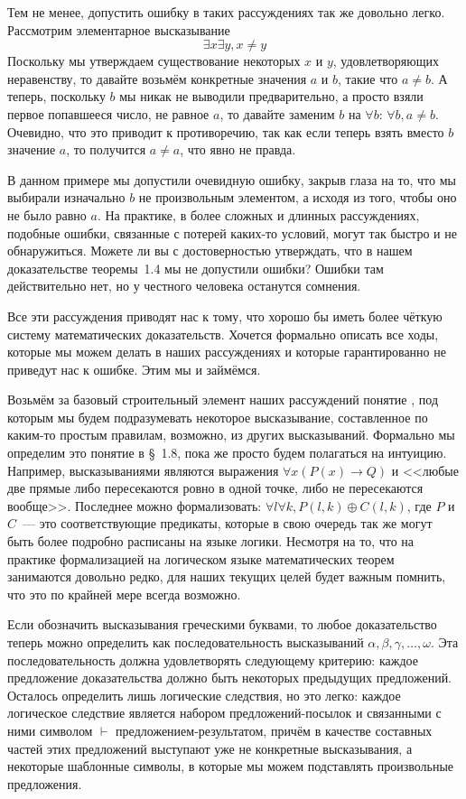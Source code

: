 Тем не менее, допустить ошибку в таких рассуждениях так же довольно легко. Рассмотрим элементарное высказывание $$\exists x \exists y, x\not= y$$
Поскольку мы утверждаем существование некоторых $x$ и $y$, удовлетворяющих неравенству, то давайте возьмём конкретные значения $a$ и $b$, такие что $a\not= b$. А теперь, поскольку $b$ мы никак не выводили предварительно, а просто взяли первое попавшееся число, не равное $a$, то давайте заменим $b$ на $\forall b$: $\forall b, a\not= b$. Очевидно, что это приводит к противоречию, так как если теперь взять вместо $b$ значение $a$, то получится $a\not= a$, что явно не правда.

В данном примере мы допустили очевидную ошибку, закрыв глаза на то, что мы выбирали изначально $b$ не произвольным элементом, а исходя из того, чтобы оно не было равно $a$. На практике, в более сложных и длинных рассуждениях, подобные ошибки, связанные с потерей каких-то условий, могут так быстро и не обнаружиться. Можете ли вы с достоверностью утверждать, что в нашем доказательстве теоремы~1.4 мы не допустили ошибки? Ошибки там действительно нет, но у честного человека останутся сомнения.

Все эти рассуждения приводят нас к тому, что хорошо бы иметь более чёткую систему математических доказательств. Хочется формально описать все ходы, которые мы можем делать в наших рассуждениях и которые гарантированно не приведут нас к ошибке. Этим мы и займёмся.

Возьмём за базовый строительный элемент наших рассуждений понятие , под которым мы будем подразумевать некоторое высказывание, составленное по каким-то простым правилам, возможно, из других высказываний. Формально мы определим это понятие в \S~1.8, пока же просто будем полагаться на интуицию. Например, высказываниями являются выражения $\forall x (P(x)\to Q)$ и <<любые две прямые либо пересекаются ровно в одной точке, либо не пересекаются вообще>>. Последнее можно формализовать: $\forall l \forall k, P(l, k) \oplus C(l, k)$, где $P$ и $C$~--- это соответствующие предикаты, которые в свою очередь так же могут быть более подробно расписаны на языке логики. Несмотря на то, что на практике формализацией на логическом языке математических теорем занимаются довольно редко, для наших текущих целей будет важным помнить, что это по крайней мере всегда возможно.

Если обозначить высказывания греческими буквами, то любое доказательство теперь можно определить как последовательность высказываний $\alpha, \beta, \gamma, \ldots, \omega$. Эта последовательность должна удовлетворять следующему критерию: каждое предложение доказательства должно быть  некоторых предыдущих предложений. Осталось определить лишь логические следствия, но это легко: каждое логическое следствие является набором предложений-посылок и связанными с ними символом $\vdash$ предложением-результатом, причём в качестве составных частей этих предложений выступают уже не конкретные высказывания, а некоторые шаблонные символы, в которые мы можем подставлять произвольные предложения.

